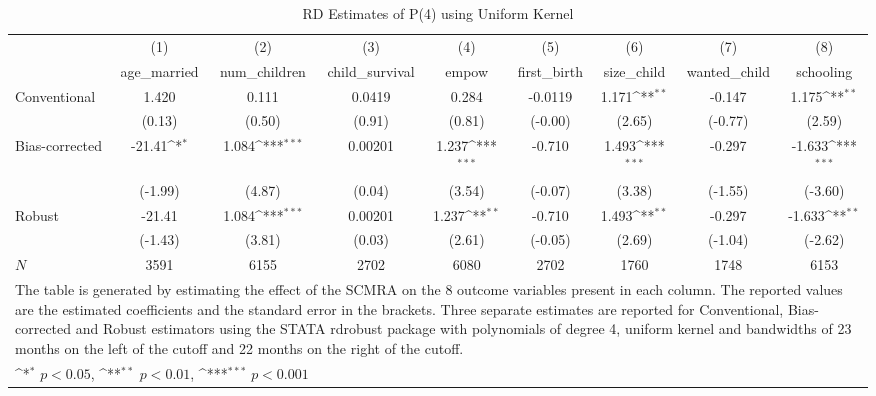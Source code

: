 \begin{table}[htbp]\centering
\def\sym#1{\ifmmode^{#1}\else\(^{#1}\)\fi}
\caption{RD Estimates of P(4) using Uniform Kernel}
\begin{tabular}{l*{8}{c}}
\toprule
            &\multicolumn{1}{c}{(1)}&\multicolumn{1}{c}{(2)}&\multicolumn{1}{c}{(3)}&\multicolumn{1}{c}{(4)}&\multicolumn{1}{c}{(5)}&\multicolumn{1}{c}{(6)}&\multicolumn{1}{c}{(7)}&\multicolumn{1}{c}{(8)}\\
            &\multicolumn{1}{c}{age\_married}&\multicolumn{1}{c}{num\_children}&\multicolumn{1}{c}{child\_survival}&\multicolumn{1}{c}{empow}&\multicolumn{1}{c}{first\_birth}&\multicolumn{1}{c}{size\_child}&\multicolumn{1}{c}{wanted\_child}&\multicolumn{1}{c}{schooling}\\
\midrule
Conventional&       1.420         &       0.111         &      0.0419         &       0.284         &     -0.0119         &       1.171\sym{**} &      -0.147         &       1.175\sym{**} \\
            &      (0.13)         &      (0.50)         &      (0.91)         &      (0.81)         &     (-0.00)         &      (2.65)         &     (-0.77)         &      (2.59)         \\
\addlinespace
Bias-corrected&      -21.41\sym{*}  &       1.084\sym{***}&     0.00201         &       1.237\sym{***}&      -0.710         &       1.493\sym{***}&      -0.297         &      -1.633\sym{***}\\
            &     (-1.99)         &      (4.87)         &      (0.04)         &      (3.54)         &     (-0.07)         &      (3.38)         &     (-1.55)         &     (-3.60)         \\
\addlinespace
Robust      &      -21.41         &       1.084\sym{***}&     0.00201         &       1.237\sym{**} &      -0.710         &       1.493\sym{**} &      -0.297         &      -1.633\sym{**} \\
            &     (-1.43)         &      (3.81)         &      (0.03)         &      (2.61)         &     (-0.05)         &      (2.69)         &     (-1.04)         &     (-2.62)         \\
\midrule
\(N\)       &        3591         &        6155         &        2702         &        6080         &        2702         &        1760         &        1748         &        6153         \\
\bottomrule
\multicolumn{9}{l}{\footnotesize The table is generated by estimating the effect of the SCMRA on the 8 outcome variables present in each column. The reported values are the estimated coefficients and the standard error in the brackets. Three separate estimates are reported for Conventional, Bias-corrected and Robust estimators using the STATA rdrobust package with polynomials of degree 4, uniform kernel and bandwidths of 23 months on the left of the cutoff and 22 months on the right of the cutoff.}\\
\multicolumn{9}{l}{\footnotesize \sym{*} \(p<0.05\), \sym{**} \(p<0.01\), \sym{***} \(p<0.001\)}\\
\end{tabular}
\end{table}
